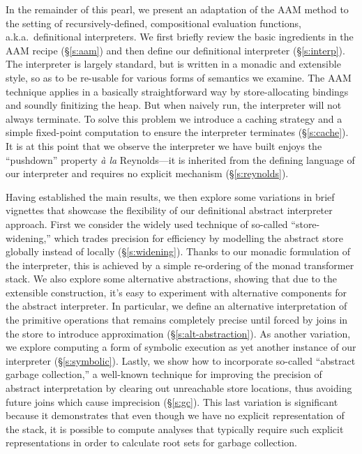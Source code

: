 In the remainder of this pearl, we present an adaptation of the AAM
method to the setting of recursively-defined, compositional evaluation
functions, a.k.a.~definitional interpreters.  We first briefly review
the basic ingredients in the AAM recipe (\S\ref{s:aam}) and then
define our definitional interpreter (\S\ref{s:interp}).  The
interpreter is largely standard, but is written in a monadic and
extensible style, so as to be re-usable for various forms of semantics
we examine.  The AAM technique applies in a basically straightforward
way by store-allocating bindings and soundly finitizing the heap.  But
when naively run, the interpreter will not always terminate.  To solve
this problem we introduce a caching strategy and a simple fixed-point
computation to ensure the interpreter terminates (\S\ref{s:cache}).
It is at this point that we observe the interpreter we have built
enjoys the ``pushdown'' property \emph{\`a la} Reynolds---it is
inherited from the defining language of our interpreter and requires
no explicit mechanism (\S\ref{s:reynolds}).

Having established the main results, we then explore some variations
in brief vignettes that showcase the flexibility of our definitional
abstract interpreter approach.  First we consider the widely used
technique of so-called ``store-widening,'' which trades precision for
efficiency by modelling the abstract store globally instead of locally
(\S\ref{s:widening}).  Thanks to our monadic formulation of the
interpreter, this is achieved by a simple re-ordering of the monad
transformer stack.  We also explore some alternative abstractions,
showing that due to the extensible construction, it's easy to
experiment with alternative components for the abstract interpreter.
In particular, we define an alternative interpretation of the primitive
operations that remains completely precise until forced by joins in
the store to introduce approximation (\S\ref{s:alt-abstraction}).  As
another variation, we explore computing a form of symbolic execution
as yet another instance of our interpreter (\S\ref{s:symbolic}).  Lastly, we
show how to incorporate so-called ``abstract garbage collection,'' a
well-known technique for improving the precision of abstract
interpretation by clearing out unreachable store locations, thus
avoiding future joins which cause imprecision (\S\ref{s:gc}).  This
last variation is significant because it demonstrates that even though
we have no explicit representation of the stack, it is possible to
compute analyses that typically require such explicit representations
in order to calculate root sets for garbage collection.

